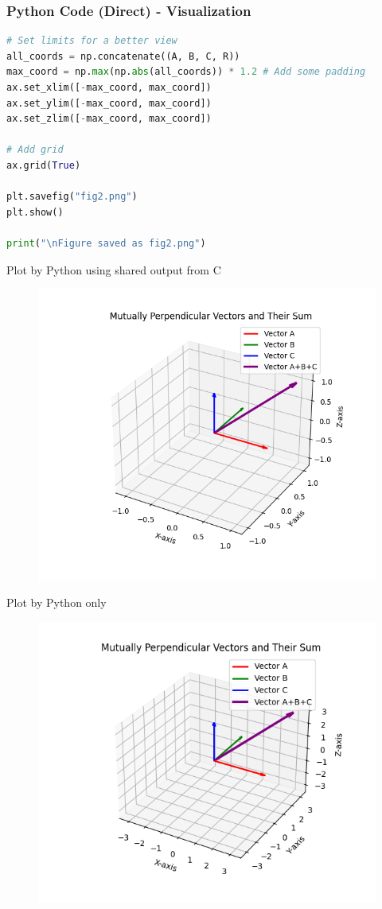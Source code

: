 \documentclass{beamer}
\begin{document}
\begin{frame}[fragile]
\frametitle{Python Code (Direct) - Visualization}
\begin{lstlisting}[language=Python]
# Set limits for a better view
all_coords = np.concatenate((A, B, C, R))
max_coord = np.max(np.abs(all_coords)) * 1.2 # Add some padding
ax.set_xlim([-max_coord, max_coord])
ax.set_ylim([-max_coord, max_coord])
ax.set_zlim([-max_coord, max_coord])

# Add grid
ax.grid(True)

plt.savefig("fig2.png")
plt.show()

print("\nFigure saved as fig2.png")
\end{lstlisting}
\end{frame}

\begin{frame}{Plot by Python using shared output from C}
\begin{figure}[H]
        \centering
        \includegraphics[width=0.8\columnwidth]{../figs/fig1.png}
        \caption{}
        \label{fig:1}
    \end{figure}
\end{frame}

 \begin{frame}{Plot by Python only}
\begin{figure}[H]
        \centering
        \includegraphics[width=0.8\columnwidth]{../figs/fig2.png}
        \caption{}
        \label{fig:2}
    \end{figure}
\end{frame}
\end{document}
